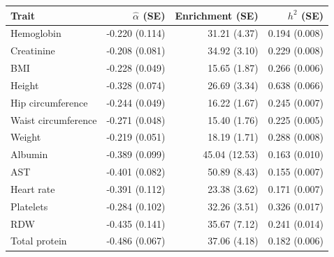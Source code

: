 \begin{tabular}{lrrr}
\toprule
Trait & $\widehat\alpha$ (SE) & Enrichment (SE) & $h^2$ (SE) \\
\midrule
Hemoglobin & -0.220 (0.114) & 31.21 (4.37) & 0.194 (0.008) \\
Creatinine & -0.208 (0.081) & 34.92 (3.10) & 0.229 (0.008) \\
BMI & -0.228 (0.049) & 15.65 (1.87) & 0.266 (0.006) \\
Height & -0.328 (0.074) & 26.69 (3.34) & 0.638 (0.066) \\
Hip circumference & -0.244 (0.049) & 16.22 (1.67) & 0.245 (0.007) \\
Waist circumference & -0.271 (0.048) & 15.40 (1.76) & 0.225 (0.005) \\
Weight & -0.219 (0.051) & 18.19 (1.71) & 0.288 (0.008) \\
Albumin & -0.389 (0.099) & 45.04 (12.53) & 0.163 (0.010) \\
AST & -0.401 (0.082) & 50.89 (8.43) & 0.155 (0.007) \\
Heart rate & -0.391 (0.112) & 23.38 (3.62) & 0.171 (0.007) \\
Platelets & -0.284 (0.102) & 32.26 (3.51) & 0.326 (0.017) \\
RDW & -0.435 (0.141) & 35.67 (7.12) & 0.241 (0.014) \\
Total protein & -0.486 (0.067) & 37.06 (4.18) & 0.182 (0.006) \\
\bottomrule
\end{tabular}
